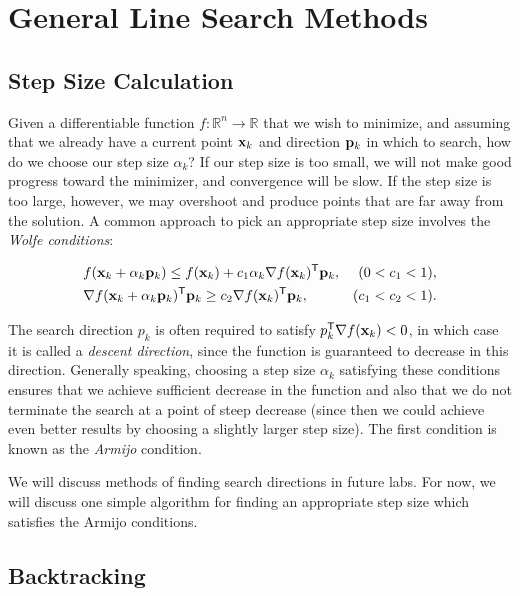 \section*{General Line Search Methods} %

\subsection*{Step Size Calculation} %

Given a differentiable function $f: \mathbb{R}^n \rightarrow \mathbb{R}$ that we wish to minimize, and assuming that we already have a current point $\mathbf{x}_k$ and direction $\mathbf{p}_k$ in which to search, how do we choose our step size $\alpha_k$? If our step size is too small, we will not make good progress toward the minimizer, and convergence will be slow.
If the step size is too large, however, we may overshoot and produce points that are far away from the solution.
A common approach to pick an appropriate step size involves the \emph{Wolfe conditions}:

\begin{align*}
&f(\mathbf{x}_k + \alpha_k\mathbf{p}_k) \leq f(\mathbf{x}_k) + c_1\alpha_k\nabla f(\mathbf{x}_k)^{\mathsf T} \mathbf{p}_k, &(0 < c_1 < 1),
\\ &\nabla f(\mathbf{x}_k + \alpha_k\mathbf{p}_k)^{\mathsf T} \mathbf{p}_k \geq c_2\nabla f(\mathbf{x}_k)^{\mathsf T} \mathbf{p}_k, &(c_1 < c_2 < 1).
\end{align*}

The search direction $p_k$ is often required to satisfy $p_k^{\mathsf T} \nabla f(\mathbf{x}_k) < 0$, in which case it is called a \emph{descent direction}, since the function is guaranteed to decrease in this direction.
Generally speaking, choosing a step size $\alpha_k$ satisfying these conditions ensures that we achieve sufficient decrease in the function and also that we do not terminate the search at a point of steep decrease (since then we could achieve even better results by choosing a slightly larger step size).
The first condition is known as the \emph{Armijo} condition.

We will discuss methods of finding search directions in future labs.
For now, we will discuss one simple algorithm for finding an appropriate step size which satisfies the Armijo conditions.

\subsection*{Backtracking} %

